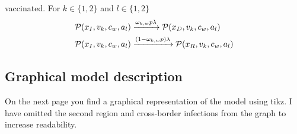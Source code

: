vaccinated. For $k \in \{1,2\}$ and $l \in \{1,2\}$
\begin{align}
    \mathcal{P}(x_I,  v_k, c_w, a_l) &\xrightarrow{\omega_{k,w} p \lambda} \mathcal{P}(x_D,  v_k, c_w, a_l) \notag \\
\mathcal{P}(x_I,  v_k, c_w, a_l) &\xrightarrow{(1-\omega_{k,w}p) \lambda} \mathcal{P}(x_R,  v_k, c_w, a_l) \notag 
\end{align}


\subsection{Graphical model description}
On the next page you find a graphical representation of the model using tikz. I have omitted the second region and cross-border infections from the graph to increase readability.  

